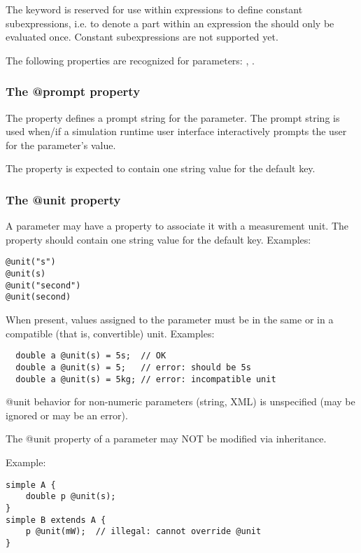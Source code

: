 \begin{note}
    The  keyword is reserved for use within expressions
    to define constant subexpressions, i.e. to denote a part within
    an expression the should only be evaluated once. Constant subexpressions
    are not supported yet.
\end{note}

The following properties are recognized for parameters: ,
.


\subsubsection{The @prompt property}

The  property defines a prompt string for the parameter. The
prompt string is used when/if a simulation runtime user interface
interactively prompts the user for the parameter's value.

The  property is expected to contain one string value for the
default key.


\subsubsection{The @unit property}

A parameter may have a  property to associate it with a measurement
unit. The  property should contain one string value for the default
key. Examples:

\begin{verbatim}
@unit("s")
@unit(s)
@unit("second")
@unit(second)
\end{verbatim}

When present, values assigned to the parameter must be in the
same or in a compatible (that is, convertible) unit.
Examples:

\begin{verbatim}
  double a @unit(s) = 5s;  // OK
  double a @unit(s) = 5;   // error: should be 5s
  double a @unit(s) = 5kg; // error: incompatible unit
\end{verbatim}

@unit behavior for non-numeric parameters (string, XML) is unspecified
(may be ignored or may be an error).

The @unit property of a parameter may NOT be modified via inheritance.

Example:
\begin{verbatim}
simple A {
    double p @unit(s);
}
simple B extends A {
    p @unit(mW);  // illegal: cannot override @unit
}
\end{verbatim}



